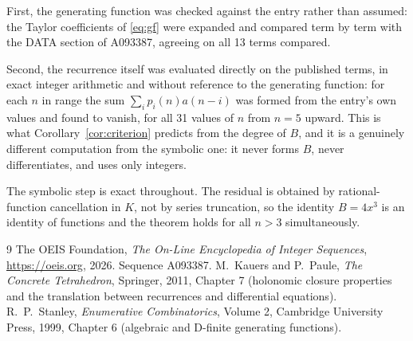 \documentclass[11pt,a4paper]{article}
\theoremstyle{plain}
\theoremstyle{definition}
\begin{document}
First, the generating function was checked against the entry rather than assumed: the
Taylor coefficients of \eqref{eq:gf} were expanded and compared term by term with the DATA
section of A093387, agreeing on all 13 terms compared.

Second, the recurrence itself was evaluated directly on the published terms, in exact
integer arithmetic and without reference to the generating function: for each $n$ in range
the sum $\sum_{i}p_{i}(n)a(n-i)$ was formed from the entry's own values and found to
vanish, for all 31 values of $n$ from $n=5$ upward. This is what
Corollary~\ref{cor:criterion} predicts from the degree of $B$, and it is a genuinely
different computation from the symbolic one: it never forms $B$, never differentiates, and
uses only integers.

The symbolic step is exact throughout. The residual is obtained by rational-function
cancellation in $K$, not by series truncation, so the identity $B=4 x^{3}$ is an
identity of functions and the theorem holds for all $n>3$ simultaneously.

\begin{thebibliography}{9}
 The OEIS Foundation, \emph{The On-Line Encyclopedia of Integer Sequences},
\url{https://oeis.org}, 2026. Sequence A093387.
 M.~Kauers and P.~Paule, \emph{The Concrete Tetrahedron}, Springer, 2011,
Chapter 7 (holonomic closure properties and the translation between recurrences and
differential equations).
 R.~P.~Stanley, \emph{Enumerative Combinatorics}, Volume 2, Cambridge
University Press, 1999, Chapter 6 (algebraic and D-finite generating functions).
\end{thebibliography}
\end{document}
